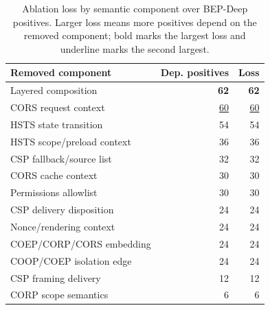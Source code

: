 \begin{table}[t]
\centering
\caption{Ablation loss by semantic component over BEP-Deep positives. Larger loss means more positives depend on the removed component; bold marks the largest loss and underline marks the second largest.}
\label{tab:ablation}
\begin{tabular}{lrr}
\toprule
Removed component & Dep. positives & Loss \\
\midrule
Layered composition & \textbf{62} & \textbf{62} \\
CORS request context & \underline{60} & \underline{60} \\
HSTS state transition & 54 & 54 \\
HSTS scope/preload context & 36 & 36 \\
CSP fallback/source list & 32 & 32 \\
CORS cache context & 30 & 30 \\
Permissions allowlist & 30 & 30 \\
CSP delivery disposition & 24 & 24 \\
Nonce/rendering context & 24 & 24 \\
COEP/CORP/CORS embedding & 24 & 24 \\
COOP/COEP isolation edge & 24 & 24 \\
CSP framing delivery & 12 & 12 \\
CORP scope semantics & 6 & 6 \\
\bottomrule
\end{tabular}
\end{table}

